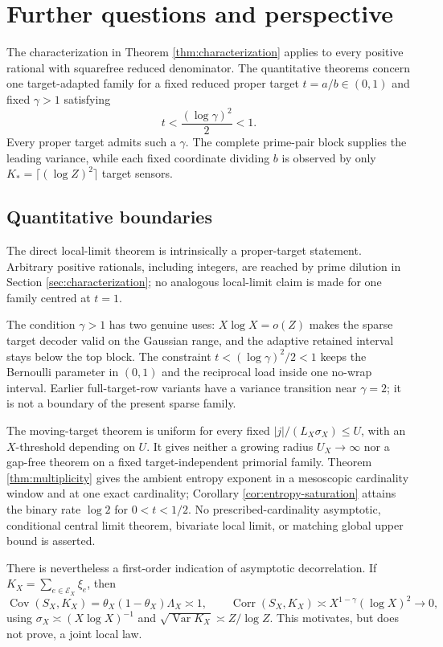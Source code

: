 \section{Further questions and perspective}\label{sec:scope}

The characterization in Theorem \ref{thm:characterization} applies to every positive rational with squarefree reduced denominator. The quantitative theorems concern one target-adapted family for a fixed reduced proper target $t=a/b\in(0,1)$ and fixed $\gamma>1$ satisfying
\[
t<\frac{(\log\gamma)^2}{2}<1.
\]
Every proper target admits such a $\gamma$. The complete prime-pair block supplies the leading variance, while each fixed coordinate dividing $b$ is observed by only $K_*=\lceil(\log Z)^2\rceil$ target sensors.

\subsection{Quantitative boundaries}

The direct local-limit theorem is intrinsically a proper-target statement. Arbitrary positive rationals, including integers, are reached by prime dilution in Section \ref{sec:characterization}; no analogous local-limit claim is made for one family centred at $t=1$.

The condition $\gamma>1$ has two genuine uses: $X\log X=o(Z)$ makes the sparse target decoder valid on the Gaussian range, and the adaptive retained interval stays below the top block. The constraint $t<(\log\gamma)^2/2<1$ keeps the Bernoulli parameter in $(0,1)$ and the reciprocal load inside one no-wrap interval. Earlier full-target-row variants have a variance transition near $\gamma=2$; it is not a boundary of the present sparse family.

The moving-target theorem is uniform for every fixed $|j|/(L_X\sigma_X)\le U$, with an $X$-threshold depending on $U$. It gives neither a growing radius $U_X\to\infty$ nor a gap-free theorem on a fixed target-independent primorial family. Theorem \ref{thm:multiplicity} gives the ambient entropy exponent in a mesoscopic cardinality window and at one exact cardinality; Corollary \ref{cor:entropy-saturation} attains the binary rate $\log2$ for $0<t<1/2$. No prescribed-cardinality asymptotic, conditional central limit theorem, bivariate local limit, or matching global upper bound is asserted.

There is nevertheless a first-order indication of asymptotic decorrelation. If $K_X=\sum_{e\in\mathcal E_X}\xi_e$, then
\[
\operatorname{Cov}(S_X,K_X)=\theta_X(1-\theta_X)\Lambda_X\asymp1,
\qquad
\operatorname{Corr}(S_X,K_X)
\asymp X^{1-\gamma}(\log X)^2\longrightarrow0,
\]
using $\sigma_X\asymp(X\log X)^{-1}$ and $\sqrt{\operatorname{Var}K_X}\asymp Z/\log Z$. This motivates, but does not prove, a joint local law.

